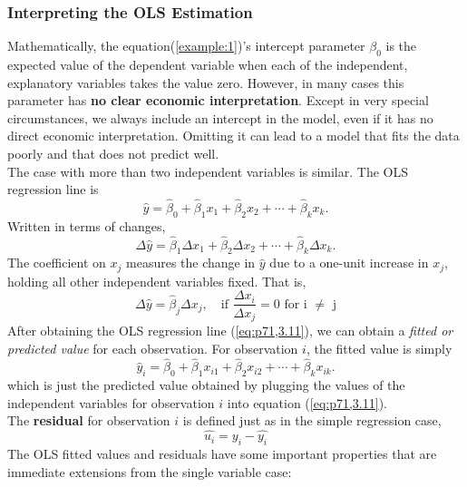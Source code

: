 \documentclass[a4paper, 10pt]{article}
\theoremstyle{definition}	%
\begin{document}
\subsubsection{Interpreting the OLS Estimation}
Mathematically, the equation(\ref{example:1})'s intercept parameter $\beta_0$ is the expected value of the dependent variable when each of the independent, explanatory variables takes the value zero. However, in many cases this parameter has \textbf{no clear economic interpretation}. Except in very special circumstances, we always include an intercept in the model, even if it has no direct economic interpretation. Omitting it can lead to a model that fits the data poorly and that does not predict well.\\
The case with more than two independent variables is similar. The OLS regression line is
\begin{equation}
    \hat{y} = \hat{\beta}_0 + \hat{\beta}_1 x_1 + \hat{\beta}_2 x_2 + \cdots + \hat{\beta}_k x_k. \label{eq:p73,3.16}
\end{equation}
Written in terms of changes,
\begin{equation}
    \Delta \hat{y} = \hat{\beta}_1 \Delta x_1 + \hat{\beta}_2 \Delta x_2 + \cdots + \hat{\beta}_k \Delta x_k. \label{eq:p73,3.17}
\end{equation}
The coefficient on $x_j$ measures the change in $\hat{y}$ due to a one-unit increase in $x_j$, holding all other independent variables fixed. That is,
\begin{equation}
    \Delta \hat{y} = \hat{\beta}_j \Delta x_j, \quad \text{if $\frac{\Delta x_i}{\Delta x_j} = 0$ for i $\neq$ j}
\end{equation}
After obtaining the OLS regression line (\ref{eq:p71,3.11}), we can obtain a \textit{fitted or predicted value} for each observation. For observation $i$, the fitted value is simply
\begin{equation}
    \hat{y}_i = \hat{\beta}_0 + \hat{\beta}_1 x_{i1} + \hat{\beta}_2 x_{i2} + \cdots + \hat{\beta}_k x_{ik}.\label{eq:p.74,3.20}
\end{equation}
which is just the predicted value obtained by plugging the values of the independent variables for observation $i$ into equation (\ref{eq:p71,3.11}).\\
The \textbf{residual} for observation $i$ is defined just as in the simple regression case,
\begin{equation}
    \hat{u_i} = y_i - \hat{y_i}
\end{equation}
The OLS fitted values and residuals have some important properties that are immediate extensions from the single variable case:
\end{document}
